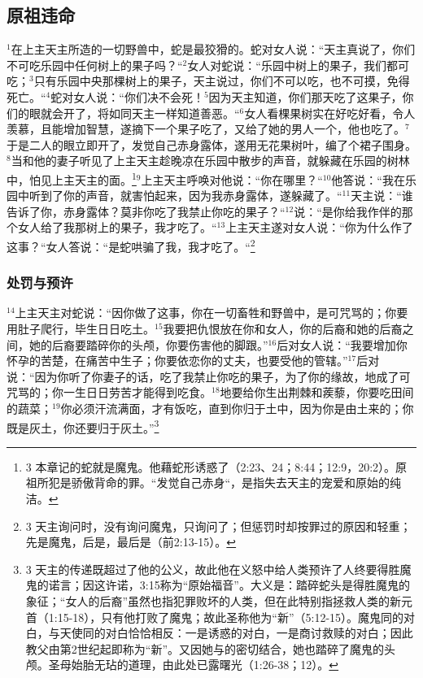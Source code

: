 \subsection{原祖违命}
$^{1}$在上主天主所造的一切野兽中，蛇是最狡猾的。蛇对女人说：“天主真说了，你们不可吃乐园中任何树上的果子吗？“$^{2}$女人对蛇说：“乐园中树上的果子，我们都可吃；$^{3}$只有乐园中央那棵树上的果子，天主说过，你们不可以吃，也不可摸，免得死亡。“$^{4}$蛇对女人说：“你们决不会死！$^{5}$因为天主知道，你们那天吃了这果子，你们的眼就会开了，将如同天主一样知道善恶。“$^{6}$女人看棵果树实在好吃好看，令人羡慕，且能增加智慧，遂摘下一个果子吃了，又给了她的男人一个，他也吃了。$^{7}$于是二人的眼立即开了，发觉自己赤身露体，遂用无花果树叶，编了个裙子围身。$^{8}$当\UL[亚当]和他的妻子听见了上主天主趁晚凉在乐园中散步的声音，就躲藏在乐园的树林中，怕见上主天主的面。\footnote{3 本章记的蛇就是魔鬼。他藉蛇形诱惑了\UL[厄娃]（2:23、24；8:44；12:9，20:2）。原祖所犯是骄傲背命的罪。“发觉自己赤身“，是指失去天主的宠爱和原始的纯洁。}$^{9}$上主天主呼唤\UL[亚当]对他说：“你在哪里？“$^{10}$他答说：“我在乐园中听到了你的声音，就害怕起来，因为我赤身露体，遂躲藏了。“$^{11}$天主说：“谁告诉了你，赤身露体？莫非你吃了我禁止你吃的果子？“$^{12}$\UL[亚当]说：“是你给我作伴的那个女人给了我那树上的果子，我才吃了。“$^{13}$上主天主遂对女人说：“你为什么作了这事？“女人答说：“是蛇哄骗了我，我才吃了。“\footnote{3 天主询问时，没有询问魔鬼，只询问了\UL[亚当]\UL[厄娃]；但惩罚时却按罪过的原因和轻重；先是魔鬼，后是\UL[厄娃]，最后是\UL[亚当]（前2:13-15）。}


\subsubsection{处罚与预许}
$^{14}$上主天主对蛇说：“因你做了这事，你在一切畜牲和野兽中，是可咒骂的；你要用肚子爬行，毕生日日吃土。$^{15}$我要把仇恨放在你和女人，你的后裔和她的后裔之间，她的后裔要踏碎你的头颅，你要伤害他的脚跟。”$^{16}$后对女人说：“我要增加你怀孕的苦楚，在痛苦中生子；你要依恋你的丈夫，也要受他的管辖。”$^{17}$后对\UL[亚当]说：“因为你听了你妻子的话，吃了我禁止你吃的果子，为了你的缘故，地成了可咒骂的；你一生日日劳苦才能得到吃食。$^{18}$地要给你生出荆棘和蒺藜，你要吃田间的蔬菜；$^{19}$你必须汗流满面，才有饭吃，直到你归于土中，因为你是由土来的；你既是灰土，你还要归于灰土。”\footnote{3 天主的传递既超过了他的公义，故此他在义怒中给人类预许了人终要得胜魔鬼的诺言；因这许诺，3:15称为“原始福音”。大义是：踏碎蛇头是得胜魔鬼的象征；“女人的后裔”虽然也指犯罪败坏的人类，但在此特别指拯救人类的新元首\UL[基督]（1:15-18），只有他打败了魔鬼；故此圣\UL[保禄]称他为“新\UL[亚当]”（5:12-15）。魔鬼同\UL[厄娃]的对白，与天使同\UL[玛利亚]的对白恰恰相反：一是诱惑的对白，一是商讨救赎的对白；因此教父由第2世纪起即称\UL[玛利亚]为“新\UL[厄娃]”。又因她与\UL[基督]的密切结合，她也踏碎了魔鬼的头颅。圣母始胎无玷的道理，由此处已露曙光（1:26-38；12）。}


